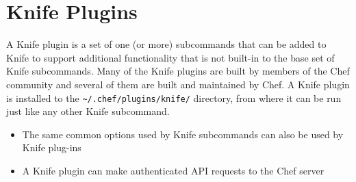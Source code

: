 \section{Knife Plugins}
\label{sec:tat-knife-plugins}

A Knife plugin is a set of one (or more) subcommands that can be added to Knife to support additional functionality that is not built-in to the base set of Knife subcommands. Many of the Knife plugins are built by members of the Chef community and several of them are built and maintained by Chef. A Knife plugin is installed to the \lstinline!~/.chef/plugins/knife/! directory, from where it can be run just like any other Knife subcommand.

\begin{itemize}
  \item The same common options used by Knife subcommands can also be used by Knife plug-ins
  \item A Knife plugin can make authenticated API requests to the Chef server
\end{itemize}
